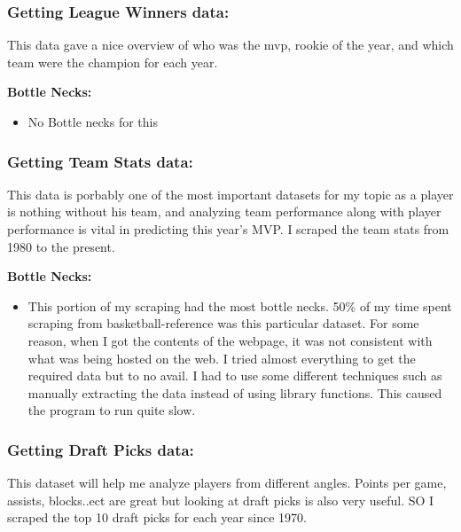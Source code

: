 \documentclass[11pt]{article}
\providecommand{\tightlist}{%
      \setlength{\itemsep}{0pt}\setlength{\parskip}{0pt}}
\begin{document}
    \subsubsection{Getting League Winners
data:}\label{getting-league-winners-data}

This data gave a nice overview of who was the mvp, rookie of the year,
and which team were the champion for each year. \newline

\textbf{Bottle Necks:}

\begin{itemize}
\tightlist
\item
  No Bottle necks for this
\end{itemize}

    \subsubsection{Getting Team Stats data:}\label{getting-team-stats-data}

This data is porbably one of the most important datasets for my topic as
a player is nothing without his team, and analyzing team performance
along with player performance is vital in predicting this year's MVP. I
scraped the team stats from 1980 to the present. \newline

\textbf{Bottle Necks:}

\begin{itemize}
\tightlist
\item
  This portion of my scraping had the most bottle necks. 50\% of my time
  spent scraping from basketball-reference was this particular dataset.
  For some reason, when I got the contents of the webpage, it was not
  consistent with what was being hosted on the web. I tried almost
  everything to get the required data but to no avail. I had to use some
  different techniques such as manually extracting the data instead of
  using library functions. This caused the program to run quite slow.
\end{itemize}

    \subsubsection{Getting Draft Picks
data:}\label{getting-draft-picks-data}

This dataset will help me analyze players from different angles. Points
per game, assists, blocks..ect are great but looking at draft picks is
also very useful. SO I scraped the top 10 draft picks for each year
since 1970. \newline
\end{document}
